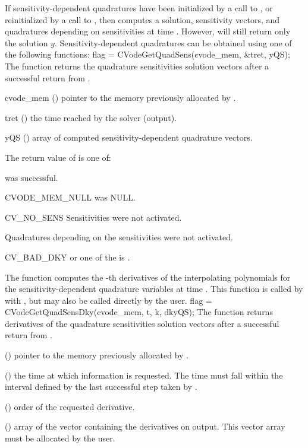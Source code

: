 If sensitivity-dependent quadratures have been initialized by a call to
, or reinitialized by a call to ,
then {\cvodes} computes a solution, sensitivity vectors, and quadratures depending on
sensitivities at time . However,  will still return only the solution
$y$. Sensitivity-dependent quadratures can be obtained using
one of the following functions:
{
  flag = CVodeGetQuadSens(cvode\_mem, \&tret, yQS);
}
{
  The function  returns the quadrature sensitivities
  solution vectors after a successful return from .
}
{
  \begin{args}
  \item[cvode\_mem] ()
    pointer to the memory previously allocated by .
  \item[tret] ()
    the time reached by the solver (output).
  \item[yQS] ()
    array of  computed sensitivity-dependent quadrature vectors.
  \end{args}
}
{
  The return value  of  is one of:
  \begin{args}[CV\_NO\_QUADSENS]
  \item[\Id{CV\_SUCCESS}] 
     was successful.
  \item[CVODE\_MEM\_NULL] 
     was NULL.
  \item[CV\_NO\_SENS]
    Sensitivities were not activated.
  \item[\Id{CV\_NO\_QUADSENS}] 
    Quadratures depending on the sensitivities were not activated.
  \item[CV\_BAD\_DKY] 
     or one of the  is .
  \end{args}
}
{}
The function  computes the -th derivatives of the interpolating 
polynomials for the sensitivity-dependent quadrature variables at time .
This function is called by  with , but may also be called 
directly by the user.
{
  flag = CVodeGetQuadSensDky(cvode\_mem, t, k, dkyQS);
}
{
  The function  returns derivatives of the quadrature sensitivities 
  solution vectors after a successful return from .
}
{
  \begin{args}
  \item[\id{cvode\_mem}] ()
    pointer to the memory previously allocated by .
  \item[\id{t}] ()
    the time at which information is requested. The time  must fall within the 
    interval defined by the last successful step taken by {\cvodes}.
  \item[\id{k}] () order of the requested derivative.
  \item[\id{dkyQS}] ()
    array of  the vector containing the derivatives on output. This vector
    array must be allocated by the user. 
  \end{args}
}
